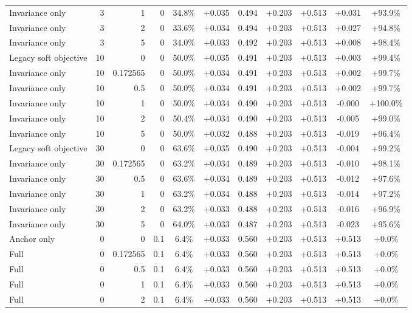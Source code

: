 \begin{table}[htbp]
\begin{tabular}{lrrrccccccc}
Invariance only & 3 & 1 & 0 & 34.8\% & +0.035 & 0.494 & +0.203 & +0.513 & +0.031 & +93.9\% \\
Invariance only & 3 & 2 & 0 & 33.6\% & +0.034 & 0.494 & +0.203 & +0.513 & +0.027 & +94.8\% \\
Invariance only & 3 & 5 & 0 & 34.0\% & +0.033 & 0.492 & +0.203 & +0.513 & +0.008 & +98.4\% \\
Legacy soft objective & 10 & 0 & 0 & 50.0\% & +0.035 & 0.491 & +0.203 & +0.513 & +0.003 & +99.4\% \\
Invariance only & 10 & 0.172565 & 0 & 50.0\% & +0.034 & 0.491 & +0.203 & +0.513 & +0.002 & +99.7\% \\
Invariance only & 10 & 0.5 & 0 & 50.0\% & +0.034 & 0.491 & +0.203 & +0.513 & +0.002 & +99.7\% \\
Invariance only & 10 & 1 & 0 & 50.0\% & +0.034 & 0.490 & +0.203 & +0.513 & -0.000 & +100.0\% \\
Invariance only & 10 & 2 & 0 & 50.4\% & +0.034 & 0.490 & +0.203 & +0.513 & -0.005 & +99.0\% \\
Invariance only & 10 & 5 & 0 & 50.0\% & +0.032 & 0.488 & +0.203 & +0.513 & -0.019 & +96.4\% \\
Legacy soft objective & 30 & 0 & 0 & 63.6\% & +0.035 & 0.490 & +0.203 & +0.513 & -0.004 & +99.2\% \\
Invariance only & 30 & 0.172565 & 0 & 63.2\% & +0.034 & 0.489 & +0.203 & +0.513 & -0.010 & +98.1\% \\
Invariance only & 30 & 0.5 & 0 & 63.6\% & +0.034 & 0.489 & +0.203 & +0.513 & -0.012 & +97.6\% \\
Invariance only & 30 & 1 & 0 & 63.2\% & +0.034 & 0.488 & +0.203 & +0.513 & -0.014 & +97.2\% \\
Invariance only & 30 & 2 & 0 & 63.2\% & +0.033 & 0.488 & +0.203 & +0.513 & -0.016 & +96.9\% \\
Invariance only & 30 & 5 & 0 & 64.0\% & +0.033 & 0.487 & +0.203 & +0.513 & -0.023 & +95.6\% \\
Anchor only & 0 & 0 & 0.1 & 6.4\% & +0.033 & 0.560 & +0.203 & +0.513 & +0.513 & +0.0\% \\
Full & 0 & 0.172565 & 0.1 & 6.4\% & +0.033 & 0.560 & +0.203 & +0.513 & +0.513 & +0.0\% \\
Full & 0 & 0.5 & 0.1 & 6.4\% & +0.033 & 0.560 & +0.203 & +0.513 & +0.513 & +0.0\% \\
Full & 0 & 1 & 0.1 & 6.4\% & +0.033 & 0.560 & +0.203 & +0.513 & +0.513 & +0.0\% \\
Full & 0 & 2 & 0.1 & 6.4\% & +0.033 & 0.560 & +0.203 & +0.513 & +0.513 & +0.0\% \\

\end{tabular}
\end{table}
